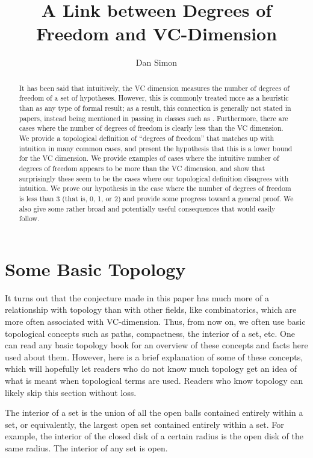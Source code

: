 \documentclass[12pt]{amsart}
\title[Final Presentation]
{A Link between Degrees of Freedom and VC-Dimension}
\author{Dan Simon}
\newcommand{\0}{\mat{0}}
\newcommand{\1}{\mathds{1}}
\begin{document}
\begin{abstract}
It has been said that intuitively, the VC dimension measures the number of degrees of freedom of a set of hypotheses. However, this is commonly treated more as a heuristic than as any type of formal result; as a result, this connection is generally not stated in papers, instead being mentioned in passing in classes such as \citep{thisclass}. Furthermore, there are cases where the number of degrees of freedom is clearly less than the VC dimension. We provide a topological definition of ``degrees of freedom'' that matches up with intuition in many common cases, and present the hypothesis that this is a lower bound for the VC dimension. We provide examples of cases where the intuitive number of degrees of freedom appears to be more than the VC dimension, and show that surprisingly these seem to be the cases where our topological definition disagrees with intuition. We prove our hypothesis in the case where the number of degrees of freedom is less than 3 (that is, 0, 1, or 2) and provide some progress toward a general proof. We also give some rather broad and potentially useful consequences that would easily follow.
\end{abstract}

\maketitle

\section{Some Basic Topology}
It turns out that the conjecture made in this paper has much more of a relationship with topology than with other fields, like combinatorics, which are more often associated with VC-dimension. Thus, from now on, we often use basic topological concepts such as paths, compactness, the interior of a set, etc. One can read any basic topology book for an overview of these concepts and facts here used about them. However, here is a brief explanation of some of these concepts, which will hopefully let readers who do not know much topology get an idea of what is meant when topological terms are used. Readers who know topology can likely skip this section without loss.

The interior of a set is the union of all the open balls contained entirely within a set, or equivalently, the largest open set contained entirely within a set. For example, the interior of the closed disk of a certain radius is the open disk of the same radius. The interior of any set is open.
\end{document}
